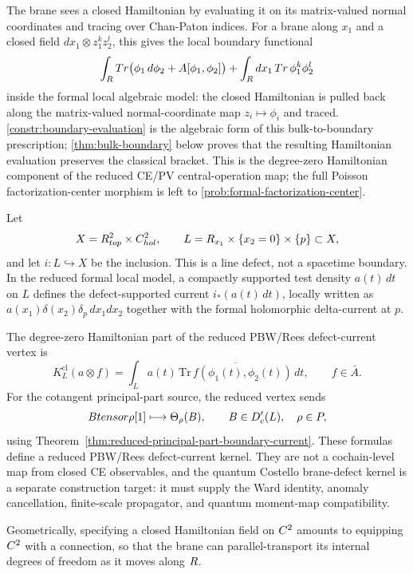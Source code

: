 \documentclass[11pt]{memoir}
\begin{document}
The brane sees a closed Hamiltonian by evaluating it on its matrix-valued
normal coordinates and tracing over Chan-Paton indices. For a brane along
$x_1$ and a closed field $dx_1\otimes z_1^kz_2^l$, this gives the local
boundary functional
$$\int_{R}Tr\bigl(\phi_1\,d\phi_2+A[\phi_1,\phi_2]\bigr)
  +\int_{R} dx_1\,Tr\,\phi_1^k\phi_2^l$$
inside the formal local algebraic model: the closed Hamiltonian is pulled
back along the matrix-valued normal-coordinate map $z_i\mapsto\phi_i$ and
traced. \ref{constr:boundary-evaluation} is the algebraic form of this
bulk-to-boundary prescription; \ref{thm:bulk-boundary} below proves that the
resulting Hamiltonian evaluation preserves the classical bracket. This is the
degree-zero Hamiltonian component of the reduced CE/PV central-operation map;
the full Poisson factorization-center morphism is left to
\ref{prob:formal-factorization-center}.

\begin{constr}\label{constr:reduced-line-defect-current-kernel}
  Let
  $$X=R^2_{top}\times C^2_{hol},\qquad
    L=R_{x_1}\times\{x_2=0\}\times\{p\}\subset X,$$
  and let $i:L\hookrightarrow X$ be the inclusion. This is a line defect, not
  a spacetime boundary. In the reduced formal local model, a compactly
  supported test density $a(t)\,dt$ on $L$ defines the defect-supported current $i_*(a(t)\,dt)$,
  locally written as $a(x_1)\delta(x_2)\delta_p\,dx_1dx_2$ together with the
  formal holomorphic delta-current at $p$.

  The degree-zero Hamiltonian part of the reduced PBW/Rees defect-current
  vertex is
  $$K_L^{\mathrm{cl}}(a\otimes f)
    =\int_L a(t)\,
      \overline{\mathrm{Tr}\,f(\phi_1(t),\phi_2(t))}\,dt,
    \qquad f\in\bar A.$$
  For the cotangent principal-part source, the reduced vertex sends
  $$Btensor\rho[1]\longmapsto\Theta_\rho(B),\qquad
    B\in D'_c(L),\quad \rho\in P,$$
  using Theorem~\ref{thm:reduced-principal-part-boundary-current}. These
  formulas define a reduced PBW/Rees defect-current kernel. They are not a
  cochain-level map from closed CE observables, and the quantum Costello
  brane-defect kernel is a separate construction target: it must supply
  the Ward identity, anomaly cancellation, finite-scale propagator, and
  quantum moment-map compatibility.
\end{constr}

\begin{rmk}
  Geometrically, specifying a closed Hamiltonian field on $C^2$ amounts to
  equipping $C^2$ with a connection, so that the brane can parallel-transport
  its internal degrees of freedom as it moves along $R$.
\end{rmk}
\end{document}
